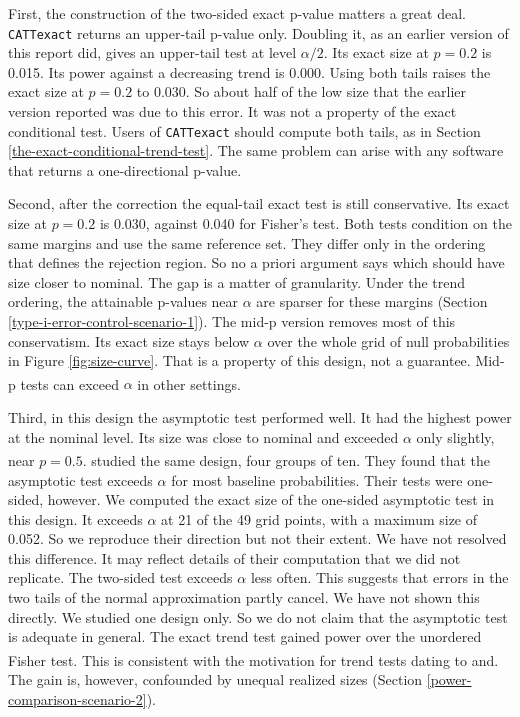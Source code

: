 \documentclass[
  11pt,
]{article}
\begin{document}
First, the construction of the two-sided exact p-value
matters a great deal. \texttt{CATTexact} returns an upper-tail
p-value only. Doubling it, as an earlier version of this
report did, gives an upper-tail test at level \(\alpha/2\).
Its exact size at \(p = 0.2\) is 0.015.
Its power against a decreasing trend is
0.000. Using both tails raises
the exact size at \(p = 0.2\) to 0.030.
So about half of the low size that the earlier version
reported was due to this error. It was not a property of
the exact conditional test. Users of \texttt{CATTexact} should
compute
both tails, as in Section
\ref{the-exact-conditional-trend-test}. The same problem
can arise with any software that returns a one-directional
p-value.

Second, after the correction the equal-tail exact test is
still conservative. Its exact size at \(p = 0.2\) is
0.030, against 0.040 for
Fisher's test. Both tests condition on the same margins
and use the same reference set. They differ only in the
ordering that defines the rejection region. So no a priori
argument says which should have size closer to nominal.
The gap is a matter of granularity. Under the trend
ordering, the attainable p-values near \(\alpha\) are
sparser for these margins (Section
\ref{type-i-error-control-scenario-1}). The mid-p
version removes most of this conservatism. Its exact size
stays below \(\alpha\) over the whole grid of null
probabilities in Figure \ref{fig:size-curve}. That is a
property of this design, not a guarantee. Mid-p tests can
exceed \(\alpha\) in other settings\textsuperscript{}.

Third, in this design the asymptotic test performed well.
It had the highest power at the nominal level. Its size
was close to nominal and exceeded \(\alpha\) only slightly,
near \(p = 0.5\).\textsuperscript{} studied the same
design, four groups of ten. They found that the asymptotic
test exceeds \(\alpha\) for most baseline probabilities.
Their tests were one-sided, however. We computed the
exact size of the one-sided asymptotic test in this
design. It exceeds \(\alpha\) at 21 of the
49 grid points, with a maximum size of
0.052. So we reproduce their direction but
not their extent. We have not resolved this difference.
It may reflect details of their computation that we did
not replicate. The two-sided test exceeds \(\alpha\) less
often. This suggests that errors in the two tails of the
normal approximation partly cancel. We have not shown
this directly.
We studied one design only. So we do not claim that the
asymptotic test is adequate in general. The exact trend test gained power
over the unordered Fisher test. This is consistent with
the motivation for trend tests dating to\textsuperscript{} and\textsuperscript{}. The gain is,
however, confounded by unequal realized sizes (Section
\ref{power-comparison-scenario-2}).
\end{document}
